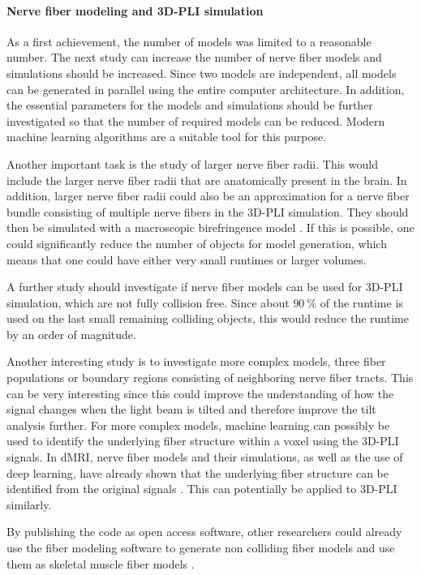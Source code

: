 \paragraph{Nerve fiber modeling and \ac{3D-PLI} simulation}
As a first achievement, the number of models was limited to a reasonable number.
The next study can increase the number of nerve fiber models and simulations should be increased.
Since two models are independent, all models can be generated in parallel using the entire computer architecture.
In addition, the essential parameters for the models and simulations should be further investigated so that the number of required models can be reduced.
Modern machine learning algorithms are a suitable tool for this purpose.
\par
%
Another important task is the study of larger nerve fiber radii.
This would include the larger nerve fiber radii that are anatomically present in the brain.
In addition, larger nerve fiber radii could also be an approximation for a nerve fiber bundle consisting of multiple nerve fibers in the \ac{3D-PLI} simulation.
They should then be simulated with a macroscopic birefringence model \cite{Menzel2015}.
If this is possible, one could significantly reduce the number of objects for model generation, which means that one could have either very small runtimes or larger volumes.
\par
%
A further study should investigate if nerve fiber models can be used for \ac{3D-PLI} simulation, which are not fully collision free.
Since about $\SI{90}{\percent}$ of the runtime is used on the last small remaining colliding objects, this would reduce the runtime by an order of magnitude.
\par
%
Another interesting study is to investigate more complex models, \eg{} three fiber populations or boundary regions consisting of neighboring nerve fiber tracts.
This can be very interesting since this could improve the understanding of how the signal changes when the light beam is tilted and therefore improve the tilt analysis further.
For more complex models, machine learning can possibly be used to identify the underlying fiber structure within a voxel using the \ac{3D-PLI} signals.
In \ac{dMRI}, nerve fiber models and their simulations, as well as the use of deep learning, have already shown that the underlying fiber structure can be identified from the original signals \cite{ginsburgerDis2019}.
This can potentially be applied to \ac{3D-PLI} similarly.
\par
%
By publishing the code as open access software, other researchers could already use the fiber modeling software to generate non colliding fiber models and use them as skeletal muscle fiber models \cite{Ji2021}.